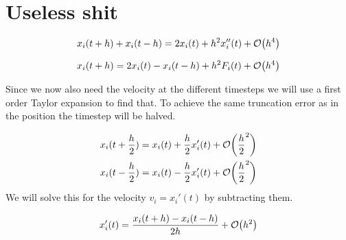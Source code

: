 \documentclass[11pt]{article}
\begin{document}
\newpage
\section{Useless shit}
		\begin{equation*}
		x_{i}(t+h) + x_{i}(t-h) = 2x_i(t) + h^2 x_i''(t) + \order{h^4} 
		\end{equation*}

		\begin{equation}
		x_{i}(t+h) = 2x_i(t) -x_{i}(t-h) + h^2 F_{i}(t) + \order{h^4} 
		\end{equation}

		\noindent Since we now also need the velocity at the different timesteps we will use a first order Taylor expansion to find that. To achieve the same truncation error as in the position the timestep will be halved.

		\begin{align*}
			x_{i}(t+\frac{h}{2}) &= x_i(t) + \frac{h}{2}x_i'(t) + \order{\frac{h}{2}^2}
			\\
			x_{i}(t-\frac{h}{2}) &= x_i(t) - \frac{h}{2}x_i'(t) + \order{\frac{h}{2}^2}
		\end{align*}
		We will solve this for the velocity \( v_i = x_i'(t) \) by subtracting them.

		\[
		x_i'(t)  = \frac{x_{i}(t+h) - x_{i}(t-h)}{2h} + \order{h^2}
		\]



	



{}

		
\end{document}
